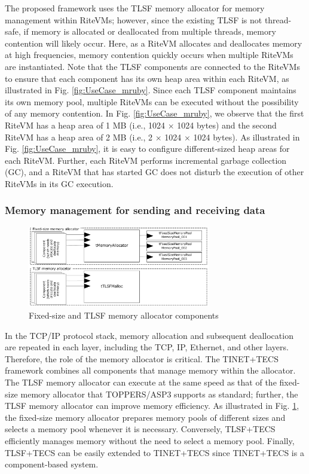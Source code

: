 \documentclass[JIP]{ipsj_v2/UTF8/ipsj}
\begin{document}
The proposed framework uses the TLSF memory allocator for memory management within RiteVMs; however, since the existing TLSF is not thread-safe, if memory is allocated or deallocated from multiple threads, memory contention will likely occur.
Here, as a RiteVM allocates and deallocates memory at high frequencies, memory contention quickly occurs when multiple RiteVMs are instantiated.
Note that the TLSF components are connected to the RiteVMs to ensure that each component has its own heap area within each RiteVM, as illustrated in Fig. \ref{fig:UseCase_mruby}.
Since each TLSF component maintains its own memory pool, multiple RiteVMs can be executed without the possibility of any memory contention.
In Fig. \ref{fig:UseCase_mruby}, we observe that the first RiteVM has a heap area of 1 MB (i.e., 1024 $\times$ 1024 bytes) and the second RiteVM has a heap area of 2 MB (i.e., 2 $\times$ 1024 $\times$ 1024 bytes).
As illustrated in Fig. \ref{fig:UseCase_mruby}, it is easy to configure different-sized heap areas for each RiteVM.
Further, each RiteVM performs incremental garbage collection (GC), and a RiteVM that has started GC does not disturb the execution of other RiteVMs in its GC execution.
    
\subsubsection*{Memory management for sending and receiving data}

\begin{figure}[t]
    \centering
    \includegraphics[width=8cm,clip]{figure/UseCase_TINET.pdf}
    \caption{Fixed-size and TLSF memory allocator components}
    \label{fig:UseCase_TINET}
\end{figure}

In the TCP/IP protocol stack, memory allocation and subsequent deallocation are repeated in each layer, including the TCP, IP, Ethernet, and other layers.
Therefore, the role of the memory allocator is critical.
The TINET+TECS framework combines all components that manage memory within the allocator.
The TLSF memory allocator can execute at the same speed as that of the fixed-size memory allocator that TOPPERS/ASP3 supports as standard; further, the TLSF memory allocator can improve memory efficiency.
As illustrated in Fig. \ref{fig:UseCase_TINET}, the fixed-size memory allocator prepares memory pools of different sizes and selects a memory pool whenever it is necessary.
Conversely, TLSF+TECS efficiently manages memory without the need to select a memory pool.
Finally, TLSF+TECS can be easily extended to TINET+TECS since TINET+TECS is a component-based system.
\end{document}
